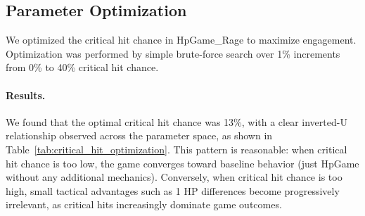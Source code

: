 \documentclass[manuscript,review,anonymous]{acmart}
\theoremstyle{definition}
\theoremstyle{plain}
\begin{document}
\subsection{Parameter Optimization}
We optimized the critical hit chance in HpGame\_Rage to maximize engagement.
Optimization was performed by simple brute-force search over 1\% increments from 0\% to 40\% critical hit chance.

\paragraph{Results.}
We found that the optimal critical hit chance was 13\%, with a clear inverted-U relationship observed across the parameter space, as shown in Table~\ref{tab:critical_hit_optimization}.
This pattern is reasonable: when critical hit chance is too low, the game converges toward baseline behavior (just HpGame without any additional mechanics).
Conversely, when critical hit chance is too high, small tactical advantages such as 1 HP differences become progressively irrelevant, as critical hits increasingly dominate game outcomes.
\end{document}
